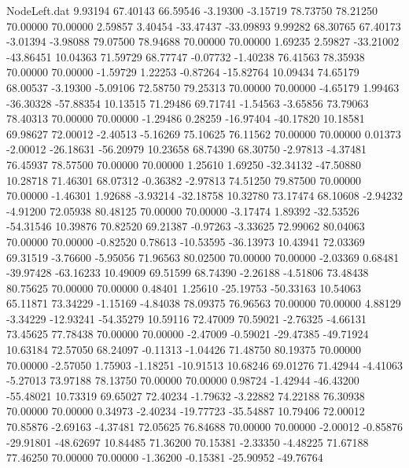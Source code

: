 \begin{filecontents}{NodeLeft.dat}
   9.93194   67.40143   66.59546    -3.19300   -3.15719   78.73750   78.21250   70.00000   70.00000    2.59857    3.40454  -33.47437  -33.09893
   9.99282   68.30765   67.40173    -3.01394   -3.98088   79.07500   78.94688   70.00000   70.00000    1.69235    2.59827  -33.21002  -43.86451
  10.04363   71.59729   68.77747    -0.07732   -1.40238   76.41563   78.35938   70.00000   70.00000   -1.59729    1.22253   -0.87264  -15.82764
  10.09434   74.65179   68.00537    -3.19300   -5.09106   72.58750   79.25313   70.00000   70.00000   -4.65179    1.99463  -36.30328  -57.88354
  10.13515   71.29486   69.71741    -1.54563   -3.65856   73.79063   78.40313   70.00000   70.00000   -1.29486    0.28259  -16.97404  -40.17820
  10.18581   69.98627   72.00012    -2.40513   -5.16269   75.10625   76.11562   70.00000   70.00000    0.01373   -2.00012  -26.18631  -56.20979
  10.23658   68.74390   68.30750    -2.97813   -4.37481   76.45937   78.57500   70.00000   70.00000    1.25610    1.69250  -32.34132  -47.50880
  10.28718   71.46301   68.07312    -0.36382   -2.97813   74.51250   79.87500   70.00000   70.00000   -1.46301    1.92688   -3.93214  -32.18758
  10.32780   73.17474   68.10608    -2.94232   -4.91200   72.05938   80.48125   70.00000   70.00000   -3.17474    1.89392  -32.53526  -54.31546
  10.39876   70.82520   69.21387    -0.97263   -3.33625   72.99062   80.04063   70.00000   70.00000   -0.82520    0.78613  -10.53595  -36.13973
  10.43941   72.03369   69.31519    -3.76600   -5.95056   71.96563   80.02500   70.00000   70.00000   -2.03369    0.68481  -39.97428  -63.16233
  10.49009   69.51599   68.74390    -2.26188   -4.51806   73.48438   80.75625   70.00000   70.00000    0.48401    1.25610  -25.19753  -50.33163
  10.54063   65.11871   73.34229    -1.15169   -4.84038   78.09375   76.96563   70.00000   70.00000    4.88129   -3.34229  -12.93241  -54.35279
  10.59116   72.47009   70.59021    -2.76325   -4.66131   73.45625   77.78438   70.00000   70.00000   -2.47009   -0.59021  -29.47385  -49.71924
  10.63184   72.57050   68.24097    -0.11313   -1.04426   71.48750   80.19375   70.00000   70.00000   -2.57050    1.75903   -1.18251  -10.91513
  10.68246   69.01276   71.42944    -4.41063   -5.27013   73.97188   78.13750   70.00000   70.00000    0.98724   -1.42944  -46.43200  -55.48021
  10.73319   69.65027   72.40234    -1.79632   -3.22882   74.22188   76.30938   70.00000   70.00000    0.34973   -2.40234  -19.77723  -35.54887
  10.79406   72.00012   70.85876    -2.69163   -4.37481   72.05625   76.84688   70.00000   70.00000   -2.00012   -0.85876  -29.91801  -48.62697
  10.84485   71.36200   70.15381    -2.33350   -4.48225   71.67188   77.46250   70.00000   70.00000   -1.36200   -0.15381  -25.90952  -49.76764

\end{filecontents}
